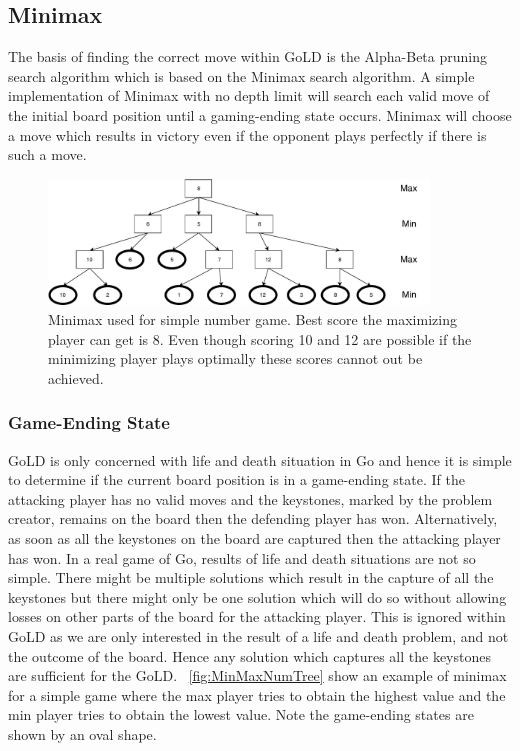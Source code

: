 \documentclass{l4proj}
\begin{document}
\subsection{Minimax}
The basis of finding the correct move within GoLD is the Alpha-Beta pruning search algorithm which is based on the Minimax search algorithm. A simple implementation of Minimax with no depth limit will search each valid move of the initial board position until a gaming-ending state occurs. Minimax will choose a move which results in victory even if the opponent plays perfectly if there is such a move.
\begin{figure}[!ht]
\centering
\includegraphics[width=0.9\textwidth]{MinMaxNumTree.pdf}
\caption{Minimax used for simple number game. Best score the maximizing player can get is 8. Even though scoring 10 and 12 are possible if the minimizing player plays optimally these scores cannot out be achieved.}
\label{fig:MinMaxNumTree}
\end{figure}

\subsubsection{Game-Ending State}
GoLD is only concerned with life and death situation in Go and hence it is simple to determine if the current board position is in a game-ending state. If the attacking player has no valid moves and the keystones, marked by the problem creator, remains on the board then the defending player has won. Alternatively, as soon as all the keystones on the board are captured then the attacking player has won. In a real game of Go, results of life and death situations are not so simple. There might be multiple solutions which result in the capture of all the keystones but there might only be one solution which will do so without allowing losses on other parts of the board for the attacking player. This is ignored within GoLD as we are only interested in the result of a life and death problem, and not the outcome of the board. Hence any solution which captures all the keystones are sufficient for the GoLD. ~\autoref{fig:MinMaxNumTree} show an example of minimax for a simple game where the max player tries to obtain the highest value and the min player tries to obtain the lowest value. Note the game-ending states are shown by an oval shape.
\end{document}

